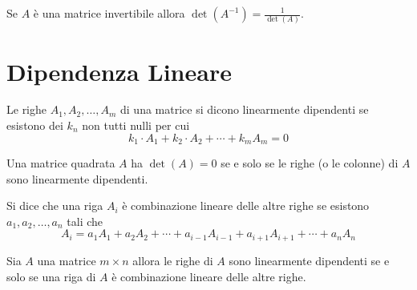 \begin{theorem}
    Se $A$ è una matrice invertibile allora $\det(A^{-1}) = \frac{1}{\det(A)}$.
\end{theorem}

\section{Dipendenza Lineare}

Le righe $A_1, A_2, \ldots, A_m$ di una matrice si dicono linearmente dipendenti se esistono dei $k_n$ non tutti nulli per cui $$k_1 \cdot A_1 + k_2 \cdot A_2 + \cdots + k_m A_m = 0$$


\begin{property}
Una matrice quadrata $A$ ha $\det(A) = 0$ se e solo se le righe (o le colonne) di $A$ sono linearmente dipendenti.
\end{property}

\begin{definition}
    Si dice che una riga $A_i$ è combinazione lineare delle altre righe se esistono $a_1,a_2,\ldots,a_n$ tali che
    $$ A_i = a_1A_1 + a_2A_2 + \cdots + a_{i-1}A_{i-1} + a_{i+1}A_{i+1} + \cdots + a_nA_n$$
\end{definition}

\begin{theorem}
    Sia $A$ una matrice $m \times n$ allora le righe di $A$ sono linearmente dipendenti se e solo se una riga di $A$ è combinazione lineare delle altre righe.
\end{theorem}
